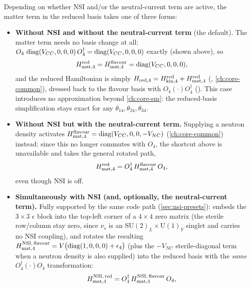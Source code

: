 \begin{theorybox}
Depending on whether NSI and/or the neutral-current term are active, the
matter term in the reduced basis takes one of three forms:
\begin{itemize}
  \item \textbf{Without NSI and without the neutral-current term} (the
    default). The matter term needs no basis change at all:
    $O_4\,\operatorname{diag}(V_{CC},0,0,0)\,O_4^\dagger=\operatorname{diag}(V_{CC},0,0,0)$ exactly
    (shown above), so
    \begin{equation}
      H_{\rm mat,4}^{\rm red} = H_{\rm mat,4}^{\rm flavour} = \operatorname{diag}(V_{CC},0,0,0),
    \end{equation}
    and the reduced Hamiltonian is simply
    $H_{\rm red,4}=H_{\rm kin,4}^{\rm red}+H_{\rm mat,4}^{\rm red}$
    (, \cref{ch:core-common}), dressed back to
    the flavour basis with $O_4(\cdot)O_4^\dagger$
    (). This case introduces no approximation
    beyond \cref{ch:core-sm}: the reduced-basis simplification stays exact
    for any $\theta_{14},\theta_{24},\theta_{34}$.
  \item \textbf{Without NSI but with the neutral-current term.} Supplying a
    neutron density activates
    $H_{\rm mat,4}^{\rm flavour}=\operatorname{diag}(V_{CC},0,0,-V_{NC})$
    (\cref{ch:core-common}) instead: since this no longer commutes with
    $O_4$, the shortcut above is unavailable and
     takes the general rotated path,
    \begin{equation}
      H_{\rm mat,4}^{\rm red}=O_4^\dagger\,H_{\rm mat,4}^{\rm flavour}\,O_4,
    \end{equation}
    even though NSI is off.
  \item \textbf{Simultaneously with NSI (and, optionally, the
    neutral-current term).} Fully supported by the same code path
    (\cref{sec:nsi-presets}): 
    embeds the $3\times3$ $\epsilon$ block into the top-left corner of a
    $4\times4$ zero matrix (the sterile row/column stay zero, since $\nu_s$
    is an $\mathrm{SU}(2)_L\times\mathrm{U}(1)_Y$ singlet and carries no NSI
    coupling), and  rotates the
    resulting
    $H_{\rm mat,4}^{\rm NSI,\,flavour}=V\bigl(\operatorname{diag}(1,0,0,0)+\epsilon_4\bigr)$
    (plus the $-V_{NC}$ sterile-diagonal term when a neutron density is also
    supplied) into the reduced basis with the \emph{same}
    $O_4^\dagger(\cdot)O_4$ transformation:
    \begin{equation}
      H_{\rm mat,4}^{\rm NSI,\,red} = O_4^\dagger\,H_{\rm mat,4}^{\rm NSI,\,flavour}\,O_4,

\end{equation}
\end{itemize}
\end{theorybox}
